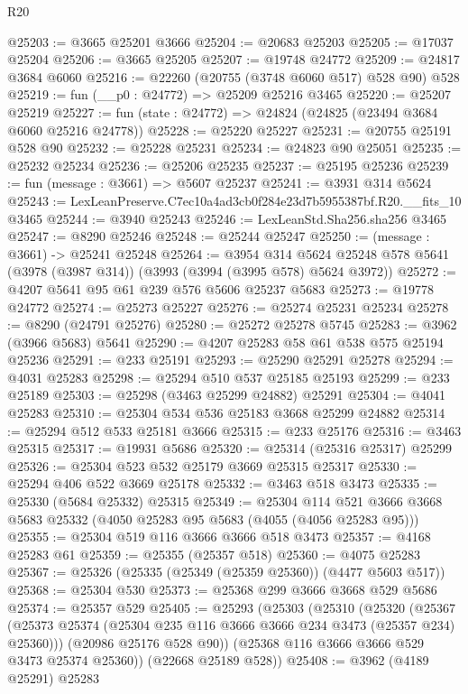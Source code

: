 \begin{lexlean}{R20}
\begin{coremodule}
@25203 := @3665 @25201 @3666
@25204 := @20683 @25203
@25205 := @17037 @25204
@25206 := @3665 @25205
@25207 := @19748 @24772
@25209 := @24817 @3684 @6060
@25216 := @22260 (@20755 (@3748 @6060 @517) @528 @90) @528
@25219 := fun (__p0 : @24772) => @25209 @25216 @3465
@25220 := @25207 @25219
@25227 := fun (state : @24772) => @24824 (@24825 (@23494 @3684 @6060 @25216 @24778))
@25228 := @25220 @25227
@25231 := @20755 @25191 @528 @90
@25232 := @25228 @25231
@25234 := @24823 @90 @25051
@25235 := @25232 @25234
@25236 := @25206 @25235
@25237 := @25195 @25236
@25239 := fun (message : @3661) => @5607 @25237
@25241 := @3931 @314 @5624
@25243 := LexLeanPreserve.C7ec10a4ad3cb0f284e23d7b5955387bf.R20.__fits_10 @3465
@25244 := @3940 @25243
@25246 := LexLeanStd.Sha256.sha256 @3465
@25247 := @8290 @25246
@25248 := @25244 @25247
@25250 := (message : @3661) -> @25241 @25248
@25264 := @3954
    @314
    @5624
    @25248
    @578
    @5641
    (@3978 (@3987 @314))
    (@3993 (@3994 (@3995 @578) @5624 @3972))
@25272 := @4207 @5641 @95 @61 @239 @576 @5606 @25237 @5683
@25273 := @19778 @24772
@25274 := @25273 @25227
@25276 := @25274 @25231 @25234
@25278 := @8290 (@24791 @25276)
@25280 := @25272 @25278 @5745
@25283 := @3962 (@3966 @5683) @5641
@25290 := @4207 @25283 @58 @61 @538 @575 @25194 @25236
@25291 := @233 @25191
@25293 := @25290 @25291 @25278
@25294 := @4031 @25283
@25298 := @25294 @510 @537 @25185 @25193
@25299 := @233 @25189
@25303 := @25298 (@3463 @25299 @24882) @25291
@25304 := @4041 @25283
@25310 := @25304 @534 @536 @25183 @3668 @25299 @24882
@25314 := @25294 @512 @533 @25181 @3666
@25315 := @233 @25176
@25316 := @3463 @25315
@25317 := @19931 @5686
@25320 := @25314 (@25316 @25317) @25299
@25326 := @25304 @523 @532 @25179 @3669 @25315 @25317
@25330 := @25294 @406 @522 @3669 @25178
@25332 := @3463 @518 @3473
@25335 := @25330 (@5684 @25332) @25315
@25349 := @25304
    @114
    @521
    @3666
    @3668
    @5683
    @25332
    (@4050 @25283 @95 @5683 (@4055 (@4056 @25283 @95)))
@25355 := @25304 @519 @116 @3666 @3666 @518 @3473
@25357 := @4168 @25283 @61
@25359 := @25355 (@25357 @518)
@25360 := @4075 @25283
@25367 := @25326 (@25335 (@25349 (@25359 @25360)) (@4477 @5603 @517))
@25368 := @25304 @530
@25373 := @25368 @299 @3666 @3668 @529 @5686
@25374 := @25357 @529
@25405 := @25293
    (@25303
      (@25310
        (@25320
          (@25367 (@25373 @25374 (@25304 @235 @116 @3666 @3666 @234 @3473 (@25357 @234) @25360)))
          (@20986 @25176 @528 @90))
        (@25368 @116 @3666 @3666 @529 @3473 @25374 @25360))
      (@22668 @25189 @528))
@25408 := @3962 (@4189 @25291) @25283

\end{coremodule}
\end{lexlean}
